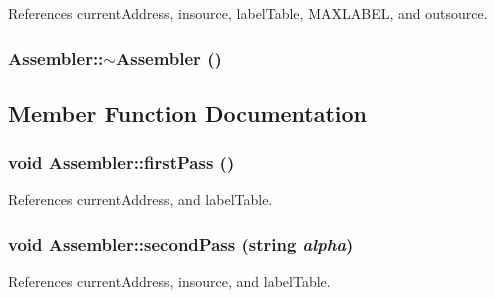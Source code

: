 References currentAddress, insource, labelTable, MAXLABEL, and outsource.

\hypertarget{classAssembler_a6e9d207baf8191cd6c4847f56548f73f}{
\subsubsection[{$\sim$Assembler}]{\setlength{\rightskip}{0pt plus 5cm}Assembler::$\sim$Assembler ()}}
\label{classAssembler_a6e9d207baf8191cd6c4847f56548f73f}


\subsection{Member Function Documentation}
\hypertarget{classAssembler_a2896bf358b7ae6c53bcc887f48cf52f3}{
\subsubsection[{firstPass}]{\setlength{\rightskip}{0pt plus 5cm}void Assembler::firstPass ()}}
\label{classAssembler_a2896bf358b7ae6c53bcc887f48cf52f3}


References currentAddress, and labelTable.

\hypertarget{classAssembler_ac9bc248b0687b5cf6aaf275255d1f808}{
\subsubsection[{secondPass}]{\setlength{\rightskip}{0pt plus 5cm}void Assembler::secondPass (string {\em alpha})}}
\label{classAssembler_ac9bc248b0687b5cf6aaf275255d1f808}


References currentAddress, insource, and labelTable.



